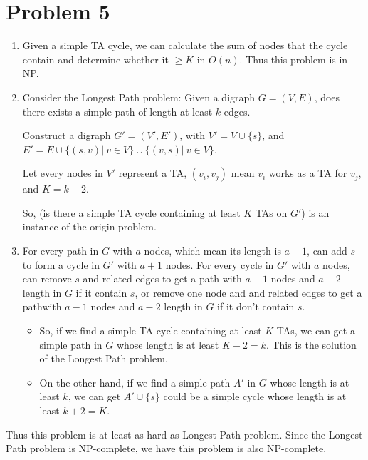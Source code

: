 \documentclass{article}
\begin{document}
\section*{Problem 5}
\begin{enumerate}[1)]
    \item Given a simple TA cycle, we can calculate the sum of nodes that the cycle contain and determine whether it $\geqslant K$ in $O(n)$.  
    Thus this problem is in NP.
    \item Consider the Longest Path problem: Given a digraph $G = (V, E)$, does there exists a simple path of length at least $k$ edges.
    
    Construct a digraph $G'=(V',E')$, 
    with $V'=V\cup \{s\}$, and $E'=E\cup \{(s,v)|~v\in V\}\cup \{(v,s)|~v\in V\}$. 

    Let every nodes in $V'$ represent a TA, $(v_i, v_j)$ mean $v_i$ works as a TA for $v_j$, and $K=k+2$.

    So, (is there a simple TA cycle containing at least $K$ TAs on $G'$) is an instance of the origin problem.
    \item 
    For every path in $G$ with $a$ nodes, which mean its length is $a-1$, can add $s$ to form a cycle in $G'$ with $a+1$ nodes.
    For every cycle in $G'$ with $a$ nodes, can remove $s$ and related edges to get a path with $a-1$ nodes and $a-2$ length in $G$ if it contain $s$, 
    or remove one node and and related edges to get a pathwith $a-1$ nodes and $a-2$ length in $G$ if it don't contain $s$. 

    \begin{itemize}
        \item 
    So, if we find a simple TA cycle containing at least $K$ TAs, 
    we can get a simple path in $G$ whose length is at least $K-2=k$. 
    This is the solution of the Longest Path problem.

    \item 
    On the other hand, if we find a simple path $A'$ in $G$ whose length is at least $k$, we can get  $A'\cup \{s\}$ could be a simple cycle whose length is at least $k+2=K$.
    \end{itemize}
\end{enumerate}

Thus this problem is at least as hard as Longest Path problem.
Since the Longest Path problem is NP-complete, 
we have this problem is also NP-complete.


\pagebreak
\end{document}
